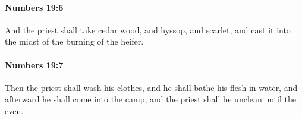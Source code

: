 		\paragraph{Numbers 19:6} %
			\label{NUMBERS-19-6}

			And the priest shall take cedar wood, and hyssop, and scarlet, and cast it into the midst of the burning of the heifer.


		\paragraph{Numbers 19:7} %
			\label{NUMBERS-19-7}

			Then the priest shall wash his clothes, and he shall bathe his flesh in water, and afterward he shall come into the camp, and the priest shall be unclean until the even.


